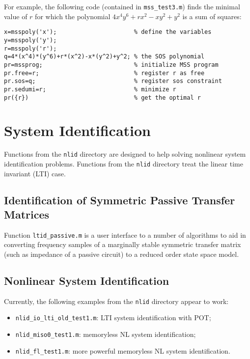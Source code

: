 \documentclass[12pt]{article}
\newcounter{example}
\begin{document}
For example, the following code (contained in {\tt mss\_test3.m})
finds the minimal value of $r$ for which
the polynomial $4x^4y^6+rx^2-xy^2+y^2$ is a sum of squares:
\begin{verbatim}
x=msspoly('x');                      % define the variables
y=msspoly('y');
r=msspoly('r');
q=4*(x^4)*(y^6)+r*(x^2)-x*(y^2)+y^2; % the SOS polynomial
pr=mssprog;                          % initialize MSS program
pr.free=r;                           % register r as free
pr.sos=q;                            % register sos constraint
pr.sedumi=r;                         % minimize r
pr({r})                              % get the optimal r
\end{verbatim}


\section{System Identification}
Functions from the {\tt nlid} directory are designed to help solving
nonlinear system identification problems. 
Functions from the {\tt nlid} directory treat the linear time invariant (LTI)
case.

\subsection{Identification of Symmetric Passive Transfer Matrices}
Function {\tt ltid\_passive.m} is a user interface to a number of
algorithms to aid in converting frequency samples of a 
marginally stable symmetric transfer
matrix (such as impedance of a passive circuit)
to a reduced order state space model.



\subsection{Nonlinear System Identification}
Currently, the following examples from the {\tt nlid} directory appear to work:
\begin{itemize}
\item {\tt nlid\_io\_lti\_old\_test1.m}: LTI system identification with
POT;
\item {\tt nlid\_miso0\_test1.m}: memoryless NL system identification;
\item {\tt nlid\_fl\_test1.m}: more powerful memoryless NL system identification.
\end{itemize}
\end{document}
